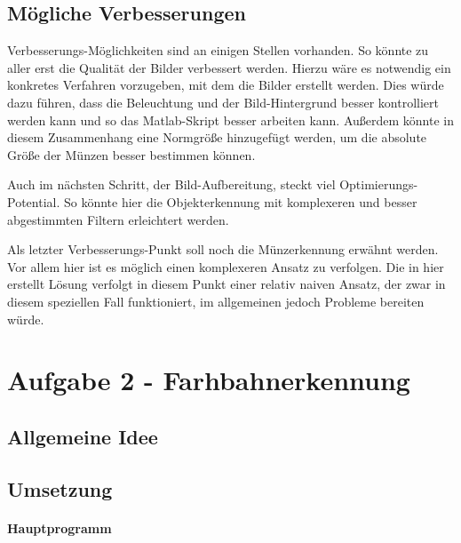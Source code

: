 \documentclass[a4paper,DIV=calc,ngerman]{scrartcl}
\begin{document}
\subsection{Mögliche Verbesserungen}
\label{sec:a1verbesserungen}
Verbesserungs-Möglichkeiten sind an einigen Stellen vorhanden. So könnte zu aller erst die Qualität der Bilder verbessert werden. Hierzu wäre es notwendig ein konkretes Verfahren vorzugeben, mit dem die Bilder erstellt werden. Dies würde dazu führen, dass die Beleuchtung und der Bild-Hintergrund besser kontrolliert werden kann und so das Matlab-Skript besser arbeiten kann. Außerdem könnte in diesem Zusammenhang eine Normgröße hinzugefügt werden, um die absolute Größe der Münzen besser bestimmen können.

Auch im nächsten Schritt, der Bild-Aufbereitung, steckt viel Optimierungs-Potential. So könnte hier die Objekterkennung mit komplexeren und besser abgestimmten Filtern erleichtert werden.

Als letzter Verbesserungs-Punkt soll noch die Münzerkennung erwähnt werden. Vor allem hier ist es möglich einen komplexeren Ansatz zu verfolgen. Die in hier erstellt Lösung verfolgt in diesem Punkt einer relativ naiven Ansatz, der zwar in diesem speziellen Fall funktioniert, im allgemeinen jedoch Probleme bereiten würde. 






\lstset{language=python}
\section{Aufgabe 2 - Farhbahnerkennung}
\label{sec:aufgabe2}



\subsection{Allgemeine Idee}
\label{sec:a2idee}



\subsection{Umsetzung}
\label{sec:a2umsetzung}

\paragraph{Hauptprogramm}
\end{document}
